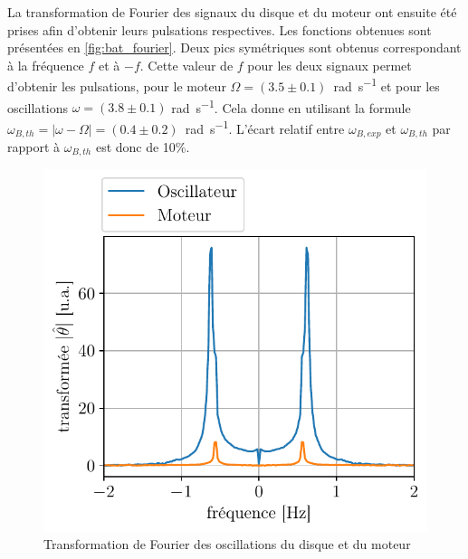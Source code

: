 La transformation de Fourier des signaux du disque et du moteur ont ensuite été prises afin d'obtenir leurs pulsations respectives. Les fonctions obtenues sont présentées en \autoref{fig:bat_fourier}. Deux pics symétriques sont obtenus correspondant à la fréquence $f$ et à $-f$. Cette valeur de $f$ pour les deux signaux permet d'obtenir les pulsations, pour le moteur \hbox{$\Omega = (3.5\pm0.1)$ \si{\radian\per\second}} et pour les oscillations $\omega = (3.8 \pm 0.1)$ \si{\radian\per\second}. Cela donne en utilisant la formule \hbox{\(\omega_{B,th} = |\omega- \Omega| = (0.4\pm0.2)\) \si{\radian\per\second}}. L'écart relatif entre $\omega_{B,exp}$ et $\omega_{B,th}$ par rapport à $\omega_{B,th}$ est donc de 10\%.
\begin{figure}
    \centering
    \includegraphics[width=\linewidth]{figures/bat_fourier.pdf}
    \caption{Transformation de Fourier des oscillations du disque et du moteur}
    \label{fig:bat_fourier}
    \vspace*{-0.5cm}
\end{figure}


